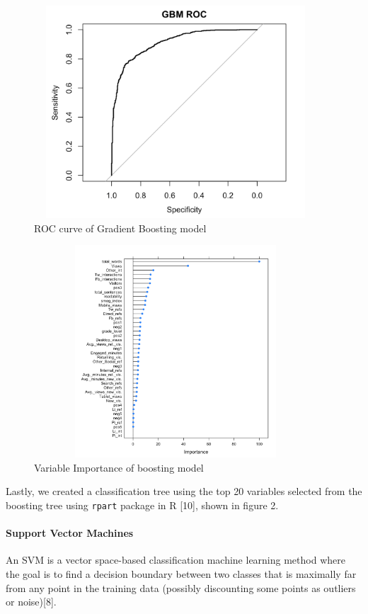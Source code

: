 \documentclass[10pt,letterpaper]{article}
\begin{document}
\begin{figure}
\includegraphics[width=400px,height=300px]{roc_gbm} \caption{ROC curve of Gradient Boosting model}\label{fig:unnamed-chunk-3}
\end{figure}

\begin{figure}
\includegraphics[width=400px,height=300px]{boost_VarImp} \caption{Variable Importance of boosting model}\label{fig:unnamed-chunk-4}
\end{figure}

Lastly, we created a classification tree using the top 20 variables
selected from the boosting tree using \texttt{rpart} package in R
{[}10{]}, shown in figure 2.

\paragraph{Support Vector Machines}\label{support-vector-machines}

An SVM is a vector space-based classification machine learning method
where the goal is to find a decision boundary between two classes that
is maximally far from any point in the training data (possibly
discounting some points as outliers or noise){[}8{]}.
\end{document}
